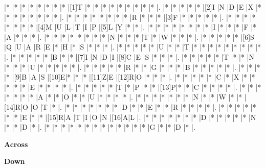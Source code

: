 \begin{Puzzle}{18}{20}
|*    |*    |*    |*    |*    |*    |*    |*    |[1]T |*    |*    |*    |*    |*    |*    |*    |*    |*    |.
|*    |*    |*    |*    |*    |[2]I |N    |D    |E    |X    |*    |*    |*    |*    |*    |*    |*    |*    |.
|*    |*    |*    |*    |*    |*    |*    |*    |R    |*    |*    |*    |[3]F |*    |*    |*    |*    |*    |.
|*    |*    |*    |*    |*    |*    |*    |*    |[4]M |U    |L    |T    |I    |P    |[5]L |Y    |*    |*    |.
|*    |*    |*    |*    |*    |*    |*    |*    |I    |*    |*    |*    |F    |*    |A    |*    |*    |*    |.
|*    |*    |*    |*    |*    |*    |*    |*    |N    |*    |*    |*    |T    |*    |W    |*    |*    |*    |.
|*    |*    |*    |*    |*    |[6]S |Q    |U    |A    |R    |E    |*    |H    |*    |S    |*    |*    |*    |.
|*    |*    |*    |*    |*    |U    |*    |*    |T    |*    |*    |*    |*    |*    |*    |*    |*    |*    |.
|*    |*    |*    |*    |*    |B    |*    |*    |[7]I |N    |D    |I    |[8]C |E    |S    |*    |*    |*    |.
|*    |*    |*    |*    |*    |T    |*    |*    |N    |*    |*    |*    |U    |*    |*    |*    |*    |*    |.
|*    |*    |*    |*    |*    |R    |*    |*    |G    |*    |*    |*    |B    |*    |*    |*    |*    |*    |.
|*    |*    |*    |*    |[9]B |A    |S    |[10]E|*    |*    |*    |[11]Z|E    |[12]R|O    |*    |*    |*    |.
|*    |*    |*    |*    |*    |C    |*    |X    |*    |*    |*    |*    |*    |E    |*    |*    |*    |*    |.
|*    |*    |*    |*    |*    |T    |*    |P    |*    |*    |[13]P|*    |*    |C    |*    |*    |*    |*    |.
|*    |*    |*    |*    |*    |*    |*    |A    |*    |*    |O    |*    |*    |U    |*    |*    |*    |*    |.
|*    |*    |*    |*    |*    |*    |*    |N    |*    |*    |W    |*    |*    |[14]R|O    |O    |T    |*    |.
|*    |*    |*    |*    |*    |*    |*    |D    |*    |*    |E    |*    |*    |R    |*    |*    |*    |*    |.
|*    |*    |*    |*    |*    |*    |*    |E    |*    |*    |[15]R|A    |T    |I    |O    |N    |[16]A|L    |.
|*    |*    |*    |*    |*    |*    |*    |D    |*    |*    |*    |*    |*    |N    |*    |*    |D    |*    |.
|*    |*    |*    |*    |*    |*    |*    |*    |*    |*    |*    |*    |*    |G    |*    |*    |D    |*    |.
\end{Puzzle}

\begin{PuzzleClues}{\textbf{Across}}
\end{PuzzleClues}
\begin{PuzzleClues}{\textbf{Down}}
\end{PuzzleClues}